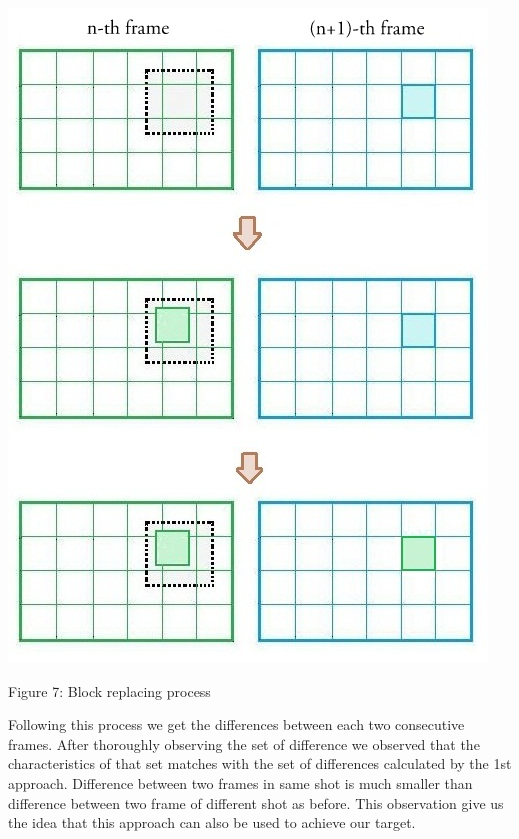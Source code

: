 \documentclass[twocolumn,twoside]{article}
\begin{document}
\begin{center}
		\includegraphics[scale=0.3]{final}
\end{center}
\vspace{-0.8cm}
\begin{center}
		{\tiny Figure 7: Block replacing process}
\end{center}
\vspace{0.2cm}

Following this process we get the differences between each two consecutive frames. After thoroughly observing the set of difference we observed that the characteristics of that set matches with the set of differences calculated by the 1st approach. Difference between two frames in same shot is much smaller than difference between two frame of different shot as before. This observation give us the idea that this approach can also be used to achieve our target.\\                
		 	
\end{document}

